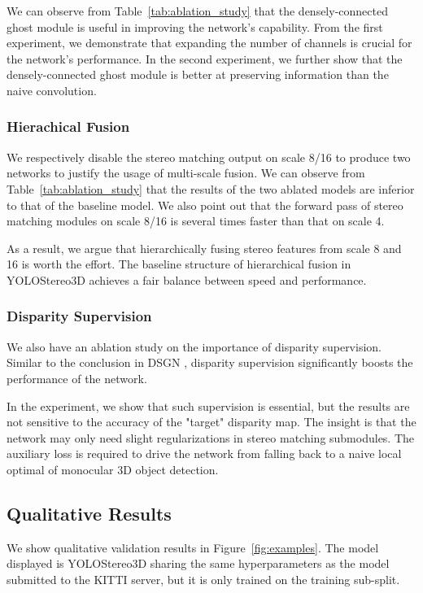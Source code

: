 \documentclass[letterpaper, 10 pt, conference]{ieeeconf}
\begin{document}
We can observe from Table~\ref{tab:ablation_study} that the densely-connected ghost module is useful in improving the network's capability. From the first experiment, we demonstrate that expanding the number of channels is crucial for the network's performance.
In the second experiment, we further show that the densely-connected ghost module is better at preserving information than the naive  convolution.

\subsubsection{Hierachical Fusion}
We respectively disable the stereo matching output on scale 8/16 to produce two networks to justify the usage of multi-scale fusion. We can observe from Table~\ref{tab:ablation_study} that the results of the two ablated models are inferior to that of the baseline model. 
We also point out that the forward pass of stereo matching modules on scale 8/16 is several times faster than that on scale 4.

As a result, we argue that hierarchically fusing stereo features from scale 8 and 16 is worth the effort. 
The baseline structure of hierarchical fusion in YOLOStereo3D achieves a fair balance between speed and performance.

\subsubsection{Disparity Supervision}
We also have an ablation study on the importance of disparity supervision. 
Similar to the conclusion in DSGN \cite{Chen2020DSGN}, disparity supervision significantly boosts the performance of the network. 

In the experiment, we show that such supervision is essential, but the results are not sensitive to the accuracy of the "target" disparity map.
The insight is that the network may only need slight regularizations in stereo matching submodules. The auxiliary loss is required to drive the network from falling back to a naive local optimal of monocular 3D object detection.


\subsection{Qualitative Results}
We show qualitative validation results in Figure~\ref{fig:examples}. 
The model displayed is YOLOStereo3D sharing the same hyperparameters as the model submitted to the KITTI server, but it is only trained on the training sub-split.
\end{document}
